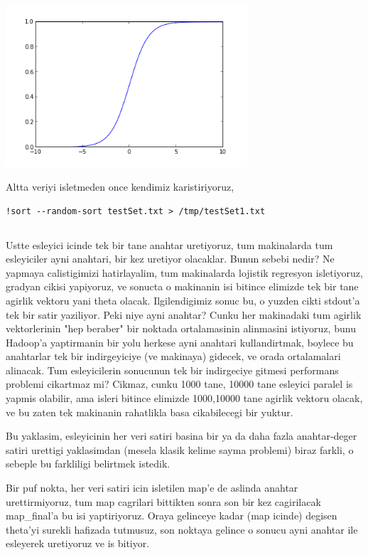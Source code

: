 \documentclass[12pt,fleqn]{article}\usepackage{../common}
\begin{document}
\includegraphics[height=6cm]{logreg1.png}

Altta veriyi isletmeden once kendimiz karistiriyoruz,

\begin{verbatim}
!sort --random-sort testSet.txt > /tmp/testSet1.txt
\end{verbatim}

\inputminted[fontsize=\footnotesize]{python}{logreg.py}

Ustte esleyici icinde tek bir tane anahtar uretiyoruz, tum makinalarda tum
esleyiciler ayni anahtari, bir kez uretiyor olacaklar. Bunun sebebi nedir?
Ne yapmaya calistigimizi hatirlayalim, tum makinalarda lojistik regresyon
isletiyoruz, gradyan cikisi yapiyoruz, ve sonucta o makinanin isi bitince
elimizde tek bir tane agirlik vektoru yani theta olacak. Ilgilendigimiz
sonuc bu, o yuzden cikti stdout'a tek bir satir yaziliyor. Peki niye ayni
anahtar? Cunku her makinadaki tum agirlik vektorlerinin "hep beraber" bir
noktada ortalamasinin alinmasini istiyoruz, bunu Hadoop'a yaptirmanin bir
yolu herkese ayni anahtari kullandirtmak, boylece bu anahtarlar tek bir
indirgeyiciye (ve makinaya) gidecek, ve orada ortalamalari alinacak. Tum
esleyicilerin sonucunun tek bir indirgeciye gitmesi performans problemi
cikartmaz mi? Cikmaz, cunku 1000 tane, 10000 tane esleyici paralel is
yapmis olabilir, ama isleri bitince elimizde 1000,10000 tane agirlik
vektoru olacak, ve bu zaten tek makinanin rahatlikla basa cikabilecegi bir
yuktur.

Bu yaklasim, esleyicinin her veri satiri basina bir ya da daha fazla
anahtar-deger satiri urettigi yaklasimdan (mesela klasik kelime sayma
problemi) biraz farkli, o sebeple bu farkliligi belirtmek istedik.

Bir puf nokta, her veri satiri icin isletilen map'e de aslinda anahtar
urettirmiyoruz, tum map cagrilari bittikten sonra son bir kez cagirilacak
map\_final'a bu isi yaptiriyoruz. Oraya gelinceye kadar (map icinde) degisen
theta'yi surekli hafizada tutmusuz, son noktaya gelince o sonucu ayni
anahtar ile esleyerek uretiyoruz ve is bitiyor.
\end{document}
